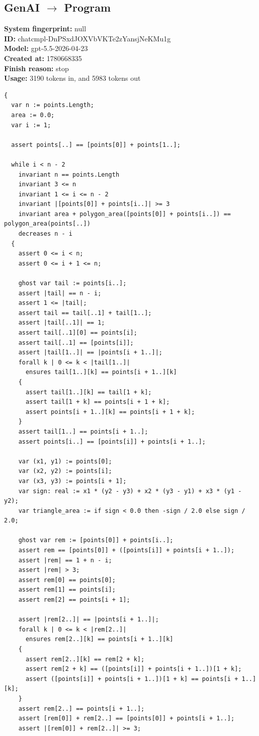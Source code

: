 \documentclass{article}
\begin{document}
\subsection*{GenAI $\rightarrow$ Program}
\textbf{System fingerprint: }null
\\\textbf{ID: }chatcmpl-DnPSxdJOXVbVKTe2zYansjNeKMu1g
\\\textbf{Model: }gpt-5.5-2026-04-23
\\\textbf{Created at: }1780668335
\\\textbf{Finish reason: }stop
\\\textbf{Usage: }3190 tokens in, and 5983 tokens out
\begin{lstlisting}
{
  var n := points.Length;
  area := 0.0;
  var i := 1;

  assert points[..] == [points[0]] + points[1..];

  while i < n - 2
    invariant n == points.Length
    invariant 3 <= n
    invariant 1 <= i <= n - 2
    invariant |[points[0]] + points[i..]| >= 3
    invariant area + polygon_area([points[0]] + points[i..]) == polygon_area(points[..])
    decreases n - i
  {
    assert 0 <= i < n;
    assert 0 <= i + 1 <= n;

    ghost var tail := points[i..];
    assert |tail| == n - i;
    assert 1 <= |tail|;
    assert tail == tail[..1] + tail[1..];
    assert |tail[..1]| == 1;
    assert tail[..1][0] == points[i];
    assert tail[..1] == [points[i]];
    assert |tail[1..]| == |points[i + 1..]|;
    forall k | 0 <= k < |tail[1..]|
      ensures tail[1..][k] == points[i + 1..][k]
    {
      assert tail[1..][k] == tail[1 + k];
      assert tail[1 + k] == points[i + 1 + k];
      assert points[i + 1..][k] == points[i + 1 + k];
    }
    assert tail[1..] == points[i + 1..];
    assert points[i..] == [points[i]] + points[i + 1..];

    var (x1, y1) := points[0];
    var (x2, y2) := points[i];
    var (x3, y3) := points[i + 1];
    var sign: real := x1 * (y2 - y3) + x2 * (y3 - y1) + x3 * (y1 - y2);
    var triangle_area := if sign < 0.0 then -sign / 2.0 else sign / 2.0;

    ghost var rem := [points[0]] + points[i..];
    assert rem == [points[0]] + ([points[i]] + points[i + 1..]);
    assert |rem| == 1 + n - i;
    assert |rem| > 3;
    assert rem[0] == points[0];
    assert rem[1] == points[i];
    assert rem[2] == points[i + 1];

    assert |rem[2..]| == |points[i + 1..]|;
    forall k | 0 <= k < |rem[2..]|
      ensures rem[2..][k] == points[i + 1..][k]
    {
      assert rem[2..][k] == rem[2 + k];
      assert rem[2 + k] == ([points[i]] + points[i + 1..])[1 + k];
      assert ([points[i]] + points[i + 1..])[1 + k] == points[i + 1..][k];
    }
    assert rem[2..] == points[i + 1..];
    assert [rem[0]] + rem[2..] == [points[0]] + points[i + 1..];
    assert |[rem[0]] + rem[2..]| >= 3;


\end{lstlisting}
\end{document}
